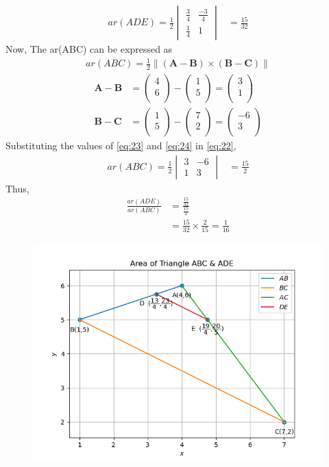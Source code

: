 \documentclass[12pt]{article}
\newcommand{\mydet}[1]{\ensuremath{\begin{vmatrix}#1\end{vmatrix}}}
\providecommand{\brak}[1]{\ensuremath{\left(#1\right)}}
\providecommand{\norm}[1]{\left\lVert#1\right\rVert}
\newcommand{\myvec}[1]{\ensuremath{\begin{pmatrix}#1\end{pmatrix}}}
\let\vec\mathbf
\begin{document}
\begin{enumerate}
\begin{align}
	ar(ADE)=\frac{1}{2}\mydet{\frac{3}{4} & \frac{-3}{4}\\ \frac{1}{4} & 1}  
	&=	\frac{15}{32}
\end{align}
Now,		
		The ar(ABC) can be expressed as
  \begin{align}
	  ar(ABC)=\frac{1}{2} \norm{\brak{\vec{A}-\vec{B}}  \times 
   \brak{\vec{B}- \vec{C}}} \label{eq:22} 
\end{align}
\begin{align}
	\vec{A}- \vec{B} &= \myvec{4\\6\\}-\myvec{1\\5\\}=\myvec{3\\1\\}\label{eq:23}\\
	  \vec{B}-\vec{C} &= \myvec{1\\5\\}-\myvec{7\\2\\}=\myvec{-6\\3\\}\label{eq:24}
  \end{align}
Substituting the values of \eqref{eq:23} and \eqref{eq:24} in \eqref{eq:22},
\begin{align}
	ar(ABC)=\frac{1}{2}\mydet{3 & -6\\1 & 3}  
	&=	\frac{15}{2}
\end{align}
		Thus,
\begin{align}
	\frac{ar\brak{ADE}}{ar\brak{ABC}}&=\frac{\frac{15}{32}}{\frac{15}{2}}\\
	&=\frac{15}{32}\times \frac{2}{15}=\frac{1}{16}
\end{align}

\begin{figure}[!h]
 \begin{center}
 \includegraphics[width=\columnwidth]{figs/fig.png}
 \end{center}
\caption{}
\label{fig:Fig1}
\end{figure}
\end{enumerate}
\end{document}
